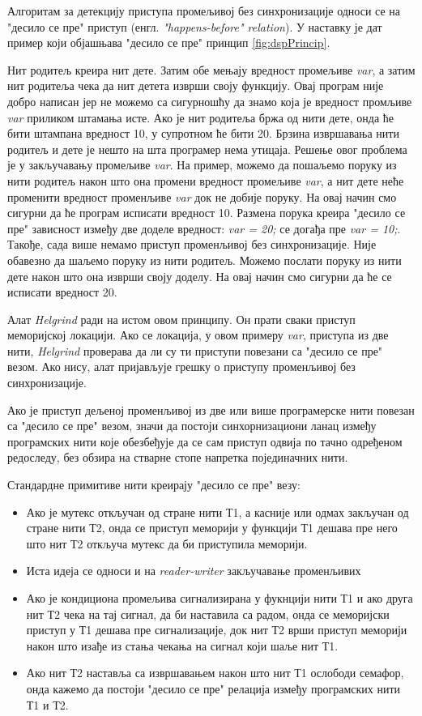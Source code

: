 \documentclass[12pt,oneside]{memoir}
\begin{document}
\indent Алгоритам за детекцију приступа промељивој без синхронизације односи се на "десило се пре" приступ (енгл. \textit{"happens-before" relation}). У наставку је дат пример који објашњава "десило се пре" принцип \ref{fig:dspPrincip}.

\indent Нит родитељ креира нит дете. Затим обе мењају вредност промељиве \textit{var}, а затим нит родитеља чека да нит детета изврши своју функцију. Овај програм није добро написан јер не можемо са сигурношћу да знамо која је вредност промљиве \textit{var} приликом штамања исте. Ако је нит родитеља бржа од нити дете, онда ће бити штампана вредност 10, у супротном ће бити 20. Брзина извршавања нити родитељ и дете је нешто на шта програмер нема утицаја. Решење овог проблема је у закључавању промељиве \textit{var}. На пример, можемо да пошаљемо поруку из нити родитељ након што она промени вредност промељиве \textit{var}, а нит дете неће променити вредност променљиве \textit{var} док не добије поруку. На овај начин смо сигурни  да ће програм исписати вредност 10. Размена порука креира "десило се пре" зависност између две доделе вредност: \textit{var = 20;} се догађа пре \textit{var = 10;}. Такође, сада више немамо приступ променљивој без синхронизације. Није обавезно да шаљемо поруку из нити родитељ. Можемо послати поруку из нити дете након што она изврши своју доделу. На овај начин смо сигурни да ће се исписати вредност 20.

\indent Алат \textit{Helgrind} ради на истом овом принципу. Он прати сваки приступ меморијској локацији. Ако се локација, у овом примеру \textit{var}, приступа из две нити, \textit{Helgrind} проверава да ли су ти приступи повезани са "десило се пре" везом. Ако нису, алат пријављује грешку о приступу променљивој без синхронизације.

\indent Ако је приступ дељеној променљивој из две или више програмерске нити повезан са "десило се пре" везом, значи да постоји синхорнизациони ланац између програмских нити које обезбеђује да се сам приступ одвија по тачно одређеном редоследу, без обзира на стварне стопе напретка појединачних нити.

\indent Стандардне примитиве нити креирају "десило се пре" везу:
\begin{itemize}
  \item Ако је мутекс откључан од стране нити Т1, а касније или одмах закључан од стране нити Т2, онда се приступ меморији у функцији Т1 дешава пре него што нит Т2 откључа мутекс да би приступила меморији.
  \item Иста идеја се односи и на \textit{reader-writer} закључавање променљивих
  \item Ако је кондициона промељива сигнализирана у фукнцији нити Т1 и ако друга нит Т2 чека на тај сигнал, да би наставила са радом, онда се меморијски приступ у Т1 дешава пре сигнализације, док нит Т2 врши приступ меморији након што изађе из стања чекања на сигнал који шаље нит Т1.
  \item Ако нит Т2 наставља са извршавањем након што нит Т1 ослободи семафор, онда кажемо да постоји "десило се пре" релација између програмских нити Т1 и Т2.
\end{itemize}
\end{document}
